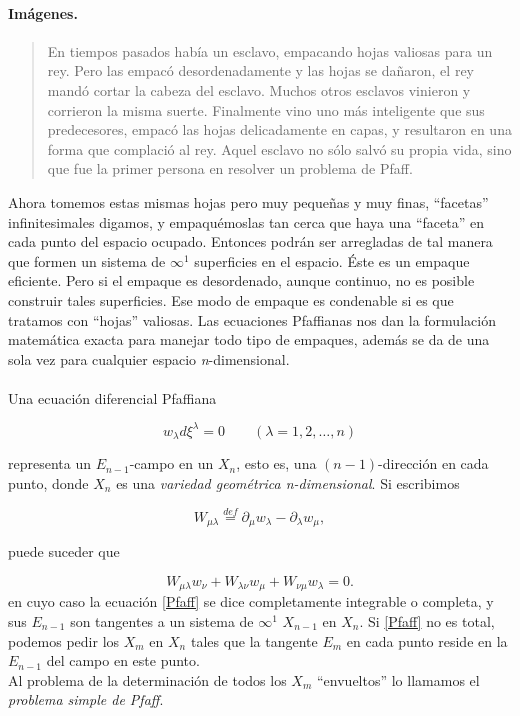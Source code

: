 \documentclass{article}
\theoremstyle{definition} \newtheorem{defi}{Definici\'on}
\theoremstyle{definition} \newtheorem{teo}{Teorema}
\theoremstyle{definition} \newtheorem{cor}{Corolario}
\begin{document}
\paragraph{Im\'agenes.}
\begin{quote}
En tiempos pasados hab\'ia un esclavo, empacando hojas valiosas para un rey. Pero las empac\'o desordenadamente y las hojas se da\~naron, el rey mand\'o cortar la cabeza del esclavo. Muchos otros esclavos vinieron y corrieron la misma suerte. Finalmente vino uno m\'as inteligente que sus predecesores, empac\'o las hojas delicadamente en capas, y resultaron en una forma que complaci\'o al rey. Aquel esclavo no s\'olo salv\'o su propia vida, sino que fue la primer persona en resolver un problema de Pfaff.
\end{quote}

Ahora tomemos estas mismas hojas pero muy peque\~nas y muy finas, ``facetas'' infinitesimales digamos, y empaqu\'emoslas tan cerca que haya una ``faceta'' en cada punto del espacio ocupado. Entonces podr\'an ser arregladas de tal manera que formen un sistema de $\infty^1$ superficies en el espacio. \'Este es un empaque eficiente. Pero si el empaque es desordenado, aunque continuo, no es posible construir tales superficies. Ese modo de empaque es condenable si es que tratamos con ``hojas'' valiosas. Las ecuaciones Pfaffianas nos dan la formulaci\'on matem\'atica exacta para manejar todo tipo de empaques, adem\'as se da de una sola vez para cualquier espacio \emph{n}-dimensional. 

\paragraph{}
Una ecuaci\'on diferencial Pfaffiana 

\begin{equation}
w_\lambda d \xi^\lambda = 0 \qquad (\lambda=1,2,\dots,n) \label{Pfaff}
\end{equation}

representa un $E_{n-1}$-campo en un $X_n$, esto es, una $(n-1)$-direcci\'on en cada punto, donde $X_n$ es una \emph{variedad geom\'etrica n-dimensional}. Si escribimos

\begin{equation}
W_{\mu\lambda} \stackrel{def}{=} \partial_{\mu}w_{\lambda} - \partial_{\lambda}w_{\mu},
\end{equation}

puede suceder que

\begin{equation}
W_{\mu\lambda}w_{\nu}+W_{\lambda\nu}w_{\mu}+W_{\nu\mu}w_{\lambda}=0.
\end{equation}
en cuyo caso la ecuaci\'on \eqref{Pfaff} se dice completamente integrable o completa, y sus $E_{n-1}$ son tangentes a un sistema de $\infty^1$ $X_{n-1}$ en $X_n$. Si \eqref{Pfaff} no es total, podemos pedir los $X_m$ en $X_n$ tales que la tangente $E_m$ en cada punto reside en la $E_{n-1}$ del campo en este punto.\\
Al problema de la determinaci\'on de todos los $X_m$ ``envueltos'' lo llamamos el \emph{problema simple de Pfaff}.
\end{document}
